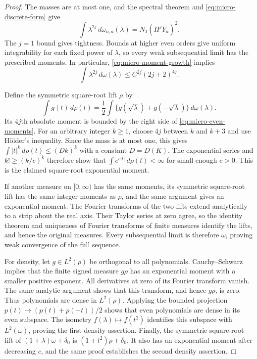 \begin{proof}
The masses are at most one, and the spectral theorem and
\eqref{eq:micro-discrete-form} give
\[
 \int\lambda^{2j}\,d\omega_{n,a}(\lambda)=N_1(H^jY_a)^2.
\]
The $j=1$ bound gives tightness.  Bounds at higher even orders give
uniform integrability for each fixed power of $\lambda$, so every
weak subsequential limit has the prescribed moments.  In particular,
\eqref{eq:micro-moment-growth} implies
\begin{equation}
 \int\lambda^{2j}\,d\omega(\lambda)
                  \le C^{2j}(2j+2)^{4j}.
 \label{eq:micro-even-moments}
\end{equation}

Define the symmetric square-root lift $\rho$ by
\[
 \int g(t)\,d\rho(t)
   =\frac12\int\{g(\sqrt\lambda)+g(-\sqrt\lambda)\}\,d\omega(\lambda).
\]
Its $4j$th absolute moment is bounded by the right side of
\eqref{eq:micro-even-moments}.  For an arbitrary integer $k\ge1$, choose
$4j$ between $k$ and $k+3$ and use H\"older's inequality.  Since the mass
is at most one, this gives $\int|t|^k\,d\rho(t)\le(Dk)^k$ with a
constant $D=D(K)$.  The exponential series and $k!\ge(k/e)^k$ therefore
show that $\int e^{c|t|}\,d\rho(t)<\infty$ for small enough $c>0$.
This is the claimed square-root exponential moment.

If another measure on $[0,\infty)$ has the same moments, its symmetric
square-root lift has the same integer moments as $\rho$, and the same
argument gives an exponential moment.  The Fourier transforms of the
two lifts extend analytically to a strip about the real axis.  Their
Taylor series at zero agree, so the identity theorem and uniqueness of
Fourier transforms of finite measures identify the lifts, and hence the
original measures.  Every subsequential limit is therefore $\omega$,
proving weak convergence of the full sequence.

For density, let $g\in L^2(\rho)$ be orthogonal to all polynomials.
Cauchy--Schwarz implies that the finite signed measure $g\rho$ has an
exponential moment with a smaller positive exponent.  All derivatives
at zero of its Fourier transform vanish.  The same analytic argument
shows that this transform, and hence $g\rho$, is zero.  Thus polynomials
are dense in $L^2(\rho)$.  Applying the bounded projection
$p(t)\mapsto(p(t)+p(-t))/2$ shows that even polynomials are dense in its
even subspace.  The isometry $f(\lambda)\mapsto f(t^2)$ identifies this
subspace with $L^2(\omega)$, proving the first density assertion.
Finally, the symmetric square-root lift of
$(1+\lambda)\omega+\delta_0$ is $(1+t^2)\rho+\delta_0$.
It also has an exponential moment after decreasing $c$, and the same
proof establishes the second density assertion.
\end{proof}

